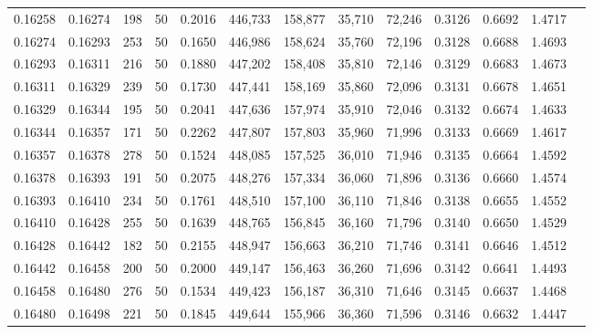 \begin{tabular}{rrrrrrrrrrrrr}
0.16258 & 0.16274 &   198 &  50 &                                     0.2016 & 446,733 & 158,877 &  35,710 &  72,246 & 0.3126 & 0.6692 & 1.4717 \\
0.16274 & 0.16293 &   253 &  50 &                                     0.1650 & 446,986 & 158,624 &  35,760 &  72,196 & 0.3128 & 0.6688 & 1.4693 \\
0.16293 & 0.16311 &   216 &  50 &                                     0.1880 & 447,202 & 158,408 &  35,810 &  72,146 & 0.3129 & 0.6683 & 1.4673 \\
0.16311 & 0.16329 &   239 &  50 &                                     0.1730 & 447,441 & 158,169 &  35,860 &  72,096 & 0.3131 & 0.6678 & 1.4651 \\
0.16329 & 0.16344 &   195 &  50 &                                     0.2041 & 447,636 & 157,974 &  35,910 &  72,046 & 0.3132 & 0.6674 & 1.4633 \\
0.16344 & 0.16357 &   171 &  50 &                                     0.2262 & 447,807 & 157,803 &  35,960 &  71,996 & 0.3133 & 0.6669 & 1.4617 \\
0.16357 & 0.16378 &   278 &  50 &                                     0.1524 & 448,085 & 157,525 &  36,010 &  71,946 & 0.3135 & 0.6664 & 1.4592 \\
0.16378 & 0.16393 &   191 &  50 &                                     0.2075 & 448,276 & 157,334 &  36,060 &  71,896 & 0.3136 & 0.6660 & 1.4574 \\
0.16393 & 0.16410 &   234 &  50 &                                     0.1761 & 448,510 & 157,100 &  36,110 &  71,846 & 0.3138 & 0.6655 & 1.4552 \\
0.16410 & 0.16428 &   255 &  50 &                                     0.1639 & 448,765 & 156,845 &  36,160 &  71,796 & 0.3140 & 0.6650 & 1.4529 \\
0.16428 & 0.16442 &   182 &  50 &                                     0.2155 & 448,947 & 156,663 &  36,210 &  71,746 & 0.3141 & 0.6646 & 1.4512 \\
0.16442 & 0.16458 &   200 &  50 &                                     0.2000 & 449,147 & 156,463 &  36,260 &  71,696 & 0.3142 & 0.6641 & 1.4493 \\
0.16458 & 0.16480 &   276 &  50 &                                     0.1534 & 449,423 & 156,187 &  36,310 &  71,646 & 0.3145 & 0.6637 & 1.4468 \\
0.16480 & 0.16498 &   221 &  50 &                                     0.1845 & 449,644 & 155,966 &  36,360 &  71,596 & 0.3146 & 0.6632 & 1.4447 \\

\end{tabular}
